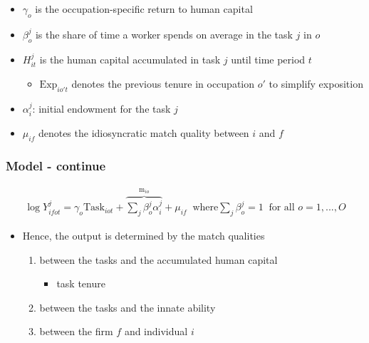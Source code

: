 \documentclass[10pt,svgnames,fragile]{beamer}
\begin{document}
{\begin{frame}
\begin{itemize}
		\item $\gamma_o$ is the occupation-specific return to human capital
		\item $\beta_{o}^{j} $ is the share of time a worker spends on average in the task $j$ in  $o$
		\item $H_{it}^j$ is the human capital accumulated in task $j$ until time period $t$
		\begin{itemize}
			\item $\text{Exp}_{io't}$ denotes the previous tenure in occupation $o'$ to simplify exposition
		\end{itemize}
		\item  $\alpha_{i}^j$: initial endowment for the task $j$
		\item $\mu_{if}$ denotes the idiosyncratic match quality between $i$ and $f$ 
	
		\end{itemize}
	
\end{frame}


\begin{frame}
\frametitle{Model - continue}
\begin{align}
	\log{Y_{ifot}^j} = \gamma_o{\text{Task}_{iot}} +{\overbrace{\sum_j \beta_{o}^j \alpha_{i}^j }^{\text{m}_{io}}}+\mu_{if} \;\;\text{where} \sum_{j} \beta_{o}^j = 1 \;\;\text{for all }o=1,...,O 
\end{align}
\begin{itemize}
	\vspace{3 mm}
	\item Hence, the output is determined by the match qualities
	\begin{enumerate}
		\vspace{1 mm}
		\item between the tasks and the accumulated human capital
		\begin{itemize}
			\item task tenure
		\end{itemize}
		\vspace{1 mm}
		\item  between the tasks and  the innate ability
		\vspace{1 mm}
		\item between the firm $f$ and individual $i$
	\end{enumerate}
\end{itemize}
\end{frame}

}
\end{document}
